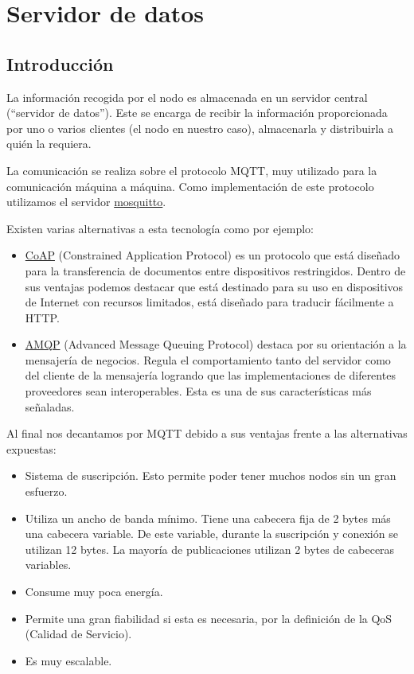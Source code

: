 \cleardoublepage

\chapter{Servidor de datos}
\label{makereference4}

\section{Introducción}
\label{makereference4.1}
La información recogida por el nodo es almacenada en un servidor central (``servidor de datos''). Este se encarga de recibir la información proporcionada por uno o varios clientes (el nodo en nuestro caso), almacenarla y distribuirla a quién la requiera.

La comunicación se realiza sobre el protocolo MQTT, muy utilizado para la comunicación máquina a máquina. Como implementación de este protocolo utilizamos el servidor \href{https://mosquitto.org/}{mosquitto}.

Existen varias alternativas a esta tecnología como por ejemplo:
\begin{itemize}
\item \href{https://en.wikipedia.org/wiki/Constrained_Application_Protocol}{CoAP} (Constrained Application Protocol) es un protocolo que está diseñado para la transferencia de documentos entre dispositivos restringidos. Dentro de sus ventajas podemos destacar que está destinado para su uso en dispositivos de Internet con recursos limitados, está diseñado para traducir fácilmente a HTTP.
\item \href{https://www.amqp.org/}{AMQP} (Advanced Message Queuing Protocol) destaca por su orientación a la mensajería de negocios. Regula el comportamiento tanto del servidor como del cliente de la mensajería logrando que las implementaciones de diferentes proveedores sean interoperables. Esta es una de sus características más señaladas.
\end{itemize}

Al final nos decantamos por MQTT debido a sus ventajas frente a las alternativas expuestas:

\begin{itemize}
\item Sistema de suscripción. Esto permite poder tener muchos nodos sin un gran esfuerzo.
\item Utiliza un ancho de banda mínimo. Tiene una cabecera fija de 2 bytes más una cabecera variable. De este variable, durante la suscripción y conexión se utilizan 12 bytes. La mayoría de publicaciones utilizan 2 bytes de cabeceras variables.
\item Consume muy poca energía.
\item Permite una gran fiabilidad si esta es necesaria, por la definición de la QoS (Calidad de Servicio).
\item Es muy escalable.
\end{itemize}

